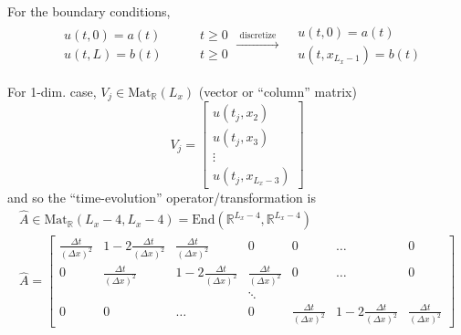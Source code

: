 \documentclass[10pt]{amsart}
\begin{document}
\begin{multicols*}{2}
  For the boundary conditions,
\[
\begin{gathered}
  \begin{aligned}
    & u(t,0) = a(t) & \qquad \, t \geq 0 \\ 
    & u(t,L) = b(t) & \qquad \, t \geq 0 
    \end{aligned} \xrightarrow{ \text{ discretize } }   \begin{aligned}
    & u(t,0) = a(t)    \\ 
    & u(t,x_{L_x-1}) = b(t)  
    \end{aligned}
\end{gathered}
\]

  For 1-dim. case, $V_j \in \text{Mat}_{\mathbb{R}}(L_x)$ (vector or ``column'' matrix)
\[
  V_j = \left[ \begin{matrix} u(t_j,x_2) \\
      u(t_j,x_3) \\
      \vdots \\
      u(t_j,x_{L_x-3}) \end{matrix} \right]
\]
  and so the ``time-evolution'' operator/transformation is
\begin{equation}
  \begin{gathered}
    \widehat{A} \in \text{Mat}_{\mathbb{R}}(L_x-4,L_x-4) = \text{End}(\mathbb{R}^{L_x-4}, \mathbb{R}^{L_x-4}) \\
    \widehat{A} = \left[ \begin{matrix}
         \frac{ \Delta t}{ (\Delta x)^2 } & 1 -  2 \frac{ \Delta t}{ (\Delta x)^2 } &  \frac{ \Delta t}{ (\Delta x)^2 } & 0 & 0 & \dots & 0  \\ 
         0 &  \frac{ \Delta t}{ (\Delta x)^2 } & 1 - 2  \frac{ \Delta t}{ (\Delta x)^2 } &  \frac{ \Delta t}{ (\Delta x)^2 } & 0 & \dots & 0 \\
         &  &  & \ddots  &   &   & \\
      0   & 0  & \dots  & 0        &  \frac{ \Delta t}{ (\Delta x)^2 } & 1 - 2  \frac{ \Delta t}{ (\Delta x)^2 } &  \frac{ \Delta t}{ (\Delta x)^2 } 
        \end{matrix} \right]
  \end{gathered}
\end{equation}  


\end{multicols*}
\end{document}
